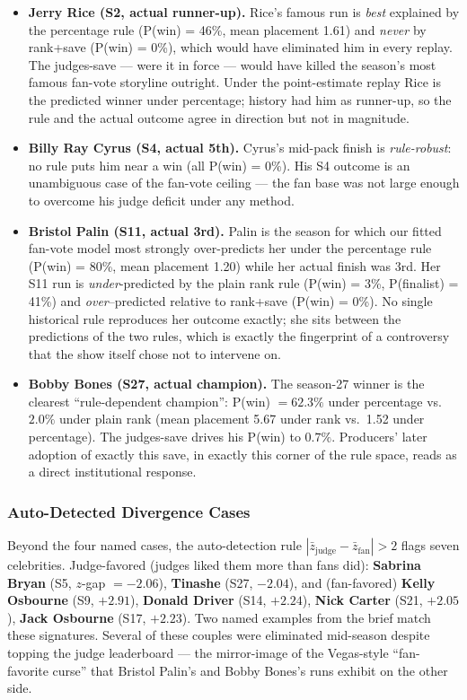 \documentclass{article}
\begin{document}
\begin{itemize}
  \item \textbf{Jerry Rice (S2, actual runner-up).} Rice's famous run is \emph{best} explained by the percentage rule (P(win) = 46\%, mean placement 1.61) and \emph{never} by rank+save (P(win) = 0\%), which would have eliminated him in every replay. The judges-save --- were it in force --- would have killed the season's most famous fan-vote storyline outright. Under the point-estimate replay Rice is the predicted winner under percentage; history had him as runner-up, so the rule and the actual outcome agree in direction but not in magnitude.
  \item \textbf{Billy Ray Cyrus (S4, actual 5th).} Cyrus's mid-pack finish is \emph{rule-robust}: no rule puts him near a win (all P(win) = 0\%). His S4 outcome is an unambiguous case of the fan-vote ceiling --- the fan base was not large enough to overcome his judge deficit under any method.
  \item \textbf{Bristol Palin (S11, actual 3rd).} Palin is the season for which our fitted fan-vote model most strongly over-predicts her under the percentage rule (P(win) = 80\%, mean placement 1.20) while her actual finish was 3rd. Her S11 run is \emph{under}-predicted by the plain rank rule (P(win) = 3\%, P(finalist) = 41\%) and \emph{over}--predicted relative to rank+save (P(win) = 0\%). No single historical rule reproduces her outcome exactly; she sits between the predictions of the two rules, which is exactly the fingerprint of a controversy that the show itself chose not to intervene on.
  \item \textbf{Bobby Bones (S27, actual champion).} The season-27 winner is the clearest ``rule-dependent champion'': P(win) $= 62.3\%$ under percentage vs.\ $2.0\%$ under plain rank (mean placement 5.67 under rank vs.\ 1.52 under percentage). The judges-save drives his P(win) to $0.7\%$. Producers' later adoption of exactly this save, in exactly this corner of the rule space, reads as a direct institutional response.
\end{itemize}

\subsubsection{Auto-Detected Divergence Cases}

Beyond the four named cases, the auto-detection rule $|\bar z_{\text{judge}} - \bar z_{\text{fan}}| > 2$ flags seven celebrities. Judge-favored (judges liked them more than fans did): \textbf{Sabrina Bryan} (S5, $z$-gap $= -2.06$), \textbf{Tinashe} (S27, $-2.04$), and (fan-favored) \textbf{Kelly Osbourne} (S9, $+2.91$), \textbf{Donald Driver} (S14, $+2.24$), \textbf{Nick Carter} (S21, $+2.05$), \textbf{Jack Osbourne} (S17, $+2.23$). Two named examples from the brief match these signatures. Several of these couples were eliminated mid-season despite topping the judge leaderboard --- the mirror-image of the Vegas-style ``fan-favorite curse'' that Bristol Palin's and Bobby Bones's runs exhibit on the other side.
\end{document}

